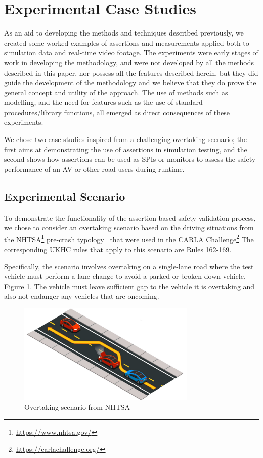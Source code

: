 \section{Experimental Case Studies} \label{Experimental_scenario}
As an aid to developing the methods and techniques described previously, we created some worked examples of assertions and measurements applied both to simulation data and real-time video footage. The experiments were early stages of work in developing the methodology, and were not developed by all the methods described in this paper, nor possess all the features described herein, but they did guide the development of the methodology and we believe that they do prove the general concept and utility of the approach. The use of methods such as modelling, and the need for features such as the use of standard procedures/library functions, all emerged as direct consequences of these experiments.

We chose two case studies inspired from a challenging overtaking scenario; the first aims at demonstrating the use of assertions in simulation testing, and the second shows how assertions can be used as SPIs or monitors to assess the safety performance of an AV or other road users during runtime.

\subsection{Experimental Scenario} %
\label{carla_challenge}
To demonstrate the functionality of the assertion based safety validation process, we chose to consider an overtaking scenario based on the driving situations from the NHTSA\footnote{\url{https://www.nhtsa.gov/}} pre-crash typology~\cite{nhtsa_precrash} that were used in the CARLA Challenge\footnote{\url{https://carlachallenge.org/}} The corresponding UKHC rules \cite{highwayCode} that apply to this scenario are Rules 162-169.

Specifically, the scenario involves overtaking on a single-lane road where the test vehicle must perform a lane change to avoid a parked or broken down vehicle, Figure \ref{fig:carla_challenge_NHTSA_task6_LHS}. The vehicle must leave sufficient gap to the vehicle it is overtaking and also not endanger any vehicles that are oncoming.

\begin{figure}[htp]
    \centering
    \includegraphics[width=8.5cm]{../other/figures/carla_challenge_NHTSA_task6_LHS.jpg}
    \caption{Overtaking scenario from NHTSA~\cite{nhtsa_precrash}}
    \label{fig:carla_challenge_NHTSA_task6_LHS}
\end{figure} 

